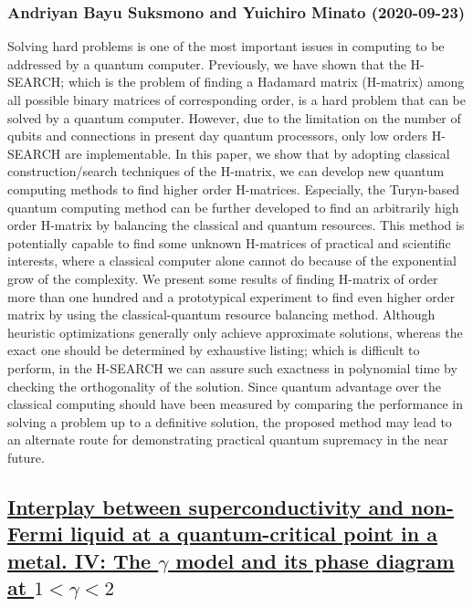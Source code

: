 {\subsubsection*{Andriyan Bayu Suksmono and Yuichiro Minato (2020-09-23)}
Solving hard problems is one of the most important issues in computing to be
addressed by a quantum computer. Previously, we have shown that the H-SEARCH;
which is the problem of finding a Hadamard matrix (H-matrix) among all possible
binary matrices of corresponding order, is a hard problem that can be solved by
a quantum computer. However, due to the limitation on the number of qubits and
connections in present day quantum processors, only low orders H-SEARCH are
implementable. In this paper, we show that by adopting classical
construction/search techniques of the H-matrix, we can develop new quantum
computing methods to find higher order H-matrices. Especially, the Turyn-based
quantum computing method can be further developed to find an arbitrarily high
order H-matrix by balancing the classical and quantum resources. This method is
potentially capable to find some unknown H-matrices of practical and scientific
interests, where a classical computer alone cannot do because of the
exponential grow of the complexity. We present some results of finding H-matrix
of order more than one hundred and a prototypical experiment to find even
higher order matrix by using the classical-quantum resource balancing method.
Although heuristic optimizations generally only achieve approximate solutions,
whereas the exact one should be determined by exhaustive listing; which is
difficult to perform, in the H-SEARCH we can assure such exactness in
polynomial time by checking the orthogonality of the solution. Since quantum
advantage over the classical computing should have been measured by comparing
the performance in solving a problem up to a definitive solution, the proposed
method may lead to an alternate route for demonstrating practical quantum
supremacy in the near future.

\subsection*{\href{http://arxiv.org/abs/2009.10911v2}{Interplay between superconductivity and non-Fermi liquid at a  quantum-critical point in a metal. IV: The $γ$ model and its phase  diagram at $1<γ<2$}}
}
